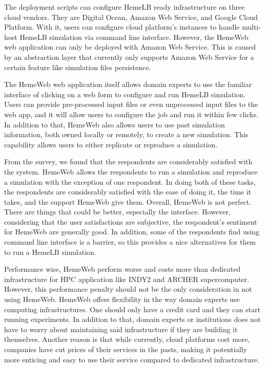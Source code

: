The deployment scripts can configure HemeLB ready infrastructure on three cloud vendors. They are Digital Ocean, Amazon Web Service, and Google Cloud Platform. With it, users can configure cloud platform's instances to handle multi-host HemeLB simulation via command line interface. However, the HemeWeb web application can only be deployed with Amazon Web Service. This is caused by an abstraction layer that currently only supports Amazon Web Service for a certain feature like simulation files persistence.

The HemeWeb web application itself allows domain experts to use the familiar interface of clicking on a web form to configure and run HemeLB simulation. Users can provide pre-processed input files or even unprocessed input files to the web app, and it will allow users to configure the job and run it within few clicks. In addition to that, HemeWeb also allows users to use past simulation information, both owned locally or remotely, to create a new simulation. This capability allows users to either replicate or reproduce a simulation.

From the survey, we found  that the respondents are considerably satisfied with the system. HemeWeb allows the respondents to run a simulation and reproduce a simulation with the exception of one respondent. In doing both of these tasks, the respondents are considerably satisfied with the ease of doing it, the time it takes, and the support HemeWeb give them. Overall, HemeWeb is not perfect. There are things that could be better, especially the interface. However, considering that the user satisfactions are subjective, the respondent's sentiment for HemeWeb are generally good. In addition, some of the respondents find using command line interface is a barrier, so this provides a nice alternatives for them to run a HemeLB simulation.

Performance wise, HemeWeb perform worse and costs more than dedicated infrastructure for HPC application like INDY2 and ARCHER supercomputer. However, this performance penalty should not be the only consideration in not using HemeWeb. HemeWeb offers flexibility in the way domain experts use computing infrastructures. One should only have a credit card and they can start running experiments. In addition to that, domain experts or institutions does not have to worry about maintaining said infrastructure if they are building it themselves. Another reason is that while currently, cloud platforms cost more, companies have cut prices of their services in the pasts\citep{AWSPr74:online, Annou90:online, Googl18:online}, making it potentially more enticing and easy to use their service compared to dedicated infrastructure.



